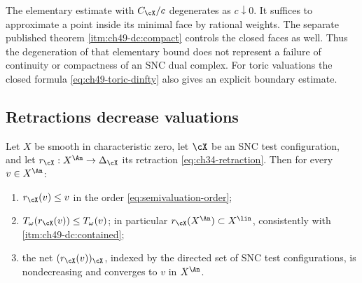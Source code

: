 \begin{remark}
\label{rem:ch49-dual-complex-lipschitz}
The elementary estimate with $C_\cX/c$ degenerates as $c\downarrow0$.
It suffices to approximate a point inside its minimal face by rational
weights.  The separate published theorem
\cref{itm:ch49-dc:compact} controls the closed faces as well.
Thus the degeneration of that elementary bound does not represent a
failure of continuity or compactness of an SNC dual complex.
For toric valuations the closed formula
\eqref{eq:ch49-toric-dinfty} also gives an explicit boundary estimate.
\end{remark}

\subsection{Retractions decrease valuations}
\label{sec:ch49-retractions}

\begin{lemma}
\label{lem:ch49-retraction-decreases}
Let $X$ be smooth in characteristic zero, let $\cX$ be an SNC test
configuration, and let $r_\cX:X^{\An}\to\Delta_\cX$
its retraction \eqref{eq:ch34-retraction}.  Then for every
$v\in X^{\An}$:
\begin{enumerate}
\item\label{itm:ch49-retr:order}
      $r_\cX(v)\le v$ in the order \eqref{eq:semivaluation-order};
\item\label{itm:ch49-retr:T}
      $T_\omega(r_\cX(v))\le T_\omega(v)$; in particular
      $r_\cX(X^{\An})\subset X^{\lin}$, consistently with
      \,\cref{itm:ch49-dc:contained};
\item\label{itm:ch49-retr:limit}
      the net $(r_\cX(v))_\cX$, indexed by the directed set of SNC test
      configurations, is nondecreasing and converges to $v$ in
      $X^{\An}$.
\end{enumerate}
\end{lemma}

